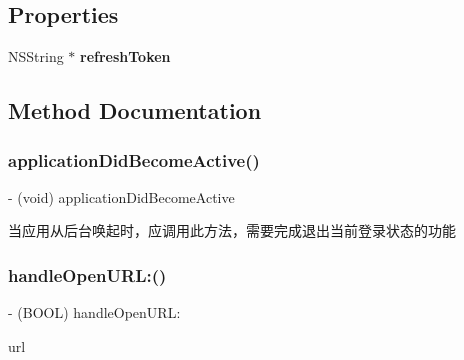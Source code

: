 \subsection*{Properties}
\begin{DoxyCompactItemize}
\item 
\mbox{\label{interfaceSinaWeibo_aa18fe7234b8a98e7592a3de57a5c61b9}} 
N\+S\+String $\ast$ {\bfseries refresh\+Token}
\end{DoxyCompactItemize}


\subsection{Method Documentation}
\mbox{\label{interfaceSinaWeibo_a25e35513f1e08bce93767002a4cc033e}} 
\subsubsection{\texorpdfstring{application\+Did\+Become\+Active()}{applicationDidBecomeActive()}}
{\footnotesize\ttfamily -\/ (void) application\+Did\+Become\+Active \begin{DoxyParamCaption}{ }\end{DoxyParamCaption}}

当应用从后台唤起时，应调用此方法，需要完成退出当前登录状态的功能 \mbox{\label{interfaceSinaWeibo_a68219880919ba0f8a902e17ca79a9158}} 
\subsubsection{\texorpdfstring{handle\+Open\+U\+R\+L\+:()}{handleOpenURL:()}}
{\footnotesize\ttfamily -\/ (B\+O\+OL) handle\+Open\+U\+R\+L\+: \begin{DoxyParamCaption}\item[{(N\+S\+U\+RL $\ast$)}]{url }\end{DoxyParamCaption}}

